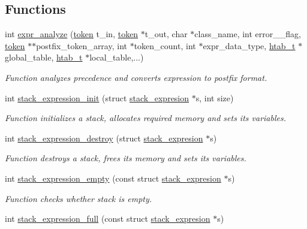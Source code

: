 \subsection*{Functions}
\begin{DoxyCompactItemize}
\item 
int \hyperlink{group__expression__processing_ga4c57a10caa30f485a261625f53528f37}{expr\+\_\+analyze} (\hyperlink{structtoken}{token} t\+\_\+in, \hyperlink{structtoken}{token} $\ast$t\+\_\+out, char $\ast$class\+\_\+name, int error\+\_\+\_\+flag, \hyperlink{structtoken}{token} $\ast$$\ast$postfix\+\_\+token\+\_\+array, int $\ast$token\+\_\+count, int $\ast$expr\+\_\+data\+\_\+type, \hyperlink{structhtab__t}{htab\+\_\+t} $\ast$global\+\_\+table, \hyperlink{structhtab__t}{htab\+\_\+t} $\ast$local\+\_\+table,...)
\begin{DoxyCompactList}\small\item\em Function analyzes precedence and converts expression to postfix format. \end{DoxyCompactList}\item 
int \hyperlink{group__expression__processing_gaff5002c4bf81b10b720b056aa0b70c5a}{stack\+\_\+expression\+\_\+init} (struct \hyperlink{structstack__expresion}{stack\+\_\+expresion} $\ast$s, int size)
\begin{DoxyCompactList}\small\item\em Function initializes a stack, allocates required memory and sets its variables. \end{DoxyCompactList}\item 
int \hyperlink{group__expression__processing_ga9fa5406eb5ecac559c4f4c6d36065fb6}{stack\+\_\+expression\+\_\+destroy} (struct \hyperlink{structstack__expresion}{stack\+\_\+expresion} $\ast$s)
\begin{DoxyCompactList}\small\item\em Function destroys a stack, frees its memory and sets its variables. \end{DoxyCompactList}\item 
int \hyperlink{group__expression__processing_ga938c2a69430813da1181adce149b6a5b}{stack\+\_\+expression\+\_\+empty} (const struct \hyperlink{structstack__expresion}{stack\+\_\+expresion} $\ast$s)
\begin{DoxyCompactList}\small\item\em Function checks whether stack is empty. \end{DoxyCompactList}\item 
int \hyperlink{group__expression__processing_gae241e2aa86c0b655cdeccdc6ad115631}{stack\+\_\+expression\+\_\+full} (const struct \hyperlink{structstack__expresion}{stack\+\_\+expresion} $\ast$s)
$$
\end{DoxyCompactItemize}
